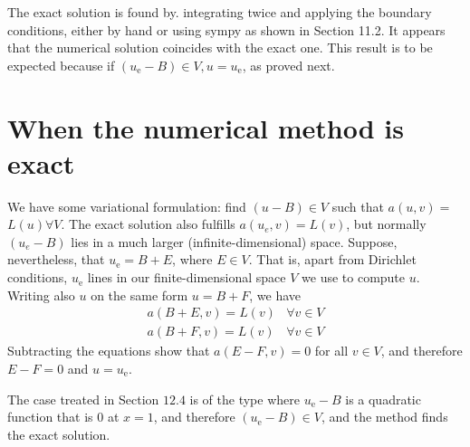 \documentclass[../main.tex]{subfiles}
\begin{document}
		The exact solution is found by. integrating twice and applying the boundary conditions, either by hand or using sympy as shown in Section 11.2. It appears that the numerical solution coincides with the exact one. This result is to be expected because if $\left(u_{\mathrm{e}}-B\right) \in V, u=u_{\mathrm{e}}$, as proved next. \bigbreak
			
	\section[When the numerical method is exact]{When the numerical method is exact}
		\label{sec:sec_12_5}
		\noindent We have some variational formulation: find $(u-B) \in V$ such that $a(u, v)=$ $L(u) \forall V$. The exact solution also fulfills $a\left(u_{e}, v\right)=L(v)$, but normally $\left(u_{e}-B\right)$ lies in a much larger (infinite-dimensional) space. Suppose, nevertheless, that $u_{\mathrm{e}}=B+E$, where $E \in V$. That is, apart from Dirichlet conditions, $u_{\mathrm{e}}$ lines in our finite-dimensional space $V$ we use to compute $u$. Writing also $u$ on the same form $u=B+F$, we have
		$$
		\begin{aligned}
			a(B+E, v)=L(v) & \forall v \in V \\
			a(B+F, v)=L(v) & \forall v \in V
		\end{aligned}
		$$
		Subtracting the equations show that $a(E-F, v)=0$ for all $v \in V$, and therefore $E-F=0$ and $u=u_{\mathrm{e}}$.
			
		The case treated in Section $12.4$ is of the type where $u_{\mathrm{e}}-B$ is a quadratic function that is 0 at $x=1$, and therefore $\left(u_{\mathrm{e}}-B\right) \in V$, and the method finds the exact solution.
	


	
\clearpage
\end{document}
